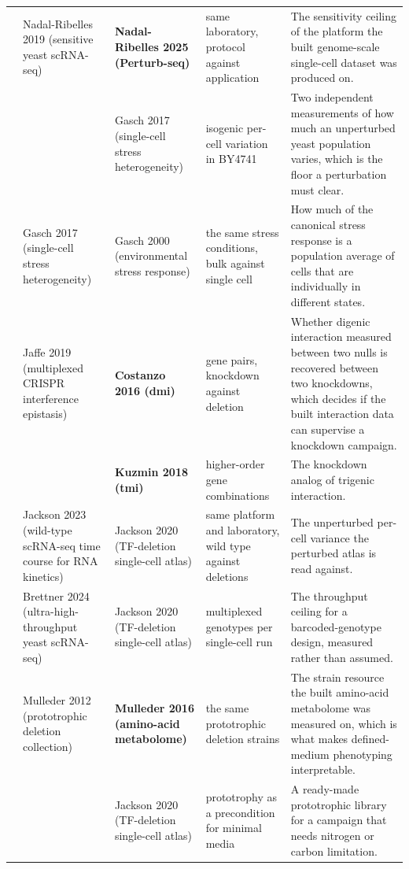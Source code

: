 \begin{landscape}
\begin{longtable}{@{}r@{\hspace{4pt}} L{42mm} L{44mm} L{48mm} L{96mm}@{}}
 & Nadal-Ribelles 2019 (sensitive yeast scRNA-seq) & \textbf{Nadal-Ribelles 2025 (Perturb-seq)} & same laboratory, protocol against application & The sensitivity ceiling of the platform the built genome-scale single-cell dataset was produced on. \\
 &  & Gasch 2017 (single-cell stress heterogeneity) & isogenic per-cell variation in BY4741 & Two independent measurements of how much an unperturbed yeast population varies, which is the floor a perturbation must clear. \\
 & Gasch 2017 (single-cell stress heterogeneity) & Gasch 2000 (environmental stress response) & the same stress conditions, bulk against single cell & How much of the canonical stress response is a population average of cells that are individually in different states. \\
 & Jaffe 2019 (multiplexed CRISPR interference epistasis) & \textbf{Costanzo 2016 (dmi)} & gene pairs, knockdown against deletion & Whether digenic interaction measured between two nulls is recovered between two knockdowns, which decides if the built interaction data can supervise a knockdown campaign. \\
 &  & \textbf{Kuzmin 2018 (tmi)} & higher-order gene combinations & The knockdown analog of trigenic interaction. \\
 & Jackson 2023 (wild-type scRNA-seq time course for RNA kinetics) & Jackson 2020 (TF-deletion single-cell atlas) & same platform and laboratory, wild type against deletions & The unperturbed per-cell variance the perturbed atlas is read against. \\
 & Brettner 2024 (ultra-high-throughput yeast scRNA-seq) & Jackson 2020 (TF-deletion single-cell atlas) & multiplexed genotypes per single-cell run & The throughput ceiling for a barcoded-genotype design, measured rather than assumed. \\
 & Mulleder 2012 (prototrophic deletion collection) & \textbf{Mulleder 2016 (amino-acid metabolome)} & the same prototrophic deletion strains & The strain resource the built amino-acid metabolome was measured on, which is what makes defined-medium phenotyping interpretable. \\
 &  & Jackson 2020 (TF-deletion single-cell atlas) & prototrophy as a precondition for minimal media & A ready-made prototrophic library for a campaign that needs nitrogen or carbon limitation. \\

\end{longtable}
\end{landscape}
